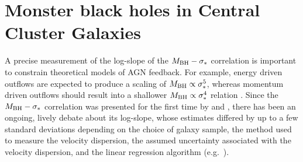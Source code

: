 \chapter{Monster black holes in Central Cluster Galaxies}
\label{ch:msigma}

A precise measurement of the log-slope of the $M_{\rm BH} - \sigma_*$ correlation is important 
to constrain theoretical models of AGN feedback. 
For example, energy driven outflows are expected to produce a scaling of $M_{\rm BH} \propto \sigma_*^5$, 
whereas momentum driven outflows should result into a shallower $M_{\rm BH} \propto \sigma_*^4$ relation 
\citep{silkrees1998,fabian1999}. 
Since the $M_{\rm BH} - \sigma_*$ correlation was presented for the first time by \citet{ferraresemerritt2000}
and \citet{gebhardt2000}, 
there has been an ongoing, lively debate about its log-slope, 
whose estimates differed by up to a few standard deviations 
depending on the choice of galaxy sample, the method used to measure the velocity dispersion,
the assumed uncertainty associated with the velocity dispersion, 
and the linear regression algorithm (e.g.~\citealt{tremaine2002}). \\ 

